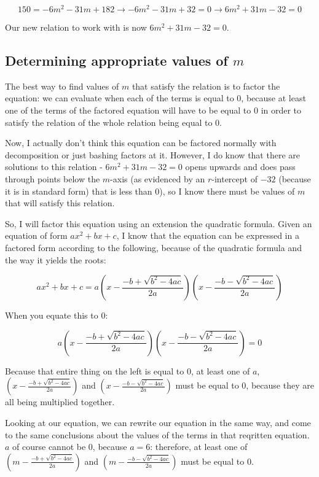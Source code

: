 \documentclass[12pt]{article}
\begin{document}
\[
150 = -6m^2 - 31m + 182 \longrightarrow -6m^2 - 31m + 32 = 0 \longrightarrow \boxed{6m^2 + 31m - 32 = 0}
\]

Our new relation to work with is now $6m^2 + 31m - 32 = 0$.

\subsection{Determining appropriate values of $m$}

The best way to find values of $m$ that satisfy the relation is to factor the equation: we can evaluate when each of the terms is equal to $0$, because at least one of the terms of the factored equation will have to be equal to $0$ in order to satisfy the relation of the whole relation being equal to $0$.

Now, I actually don't think this equation can be factored normally with decomposition or just bashing factors at it.
However, I do know that there are solutions to this relation - $6m^2 + 31m - 32 = 0$ opens upwards and does pass through points below the $m$-axis (as evidenced by an $r$-intercept of $-32$ (because it is in standard form) that is less than $0$), so I know there must be values of $m$ that will satisfy this relation.

So, I will factor this equation using an extension the quadratic formula.
Given an equation of form $ax^2 + bx + c$, I know that the equation can be expressed in a factored form according to the following, because of the quadratic formula and the way it yields the roots:

\[
ax^2 + bx + c = a \left( x - \frac{-b + \sqrt{b^2 - 4ac}}{2a} \right) \left( x - \frac{-b - \sqrt{b^2 - 4ac}}{2a} \right)
\]

When you equate this to $0$:

\[
a \left( x - \frac{-b + \sqrt{b^2 - 4ac}}{2a} \right) \left( x - \frac{-b - \sqrt{b^2 - 4ac}}{2a} \right) = 0
\]

Because that entire thing on the left is equal to $0$, at least one of $a$, $\left( x - \frac{-b + \sqrt{b^2 - 4ac}}{2a} \right)$ and $\left( x - \frac{-b - \sqrt{b^2 - 4ac}}{2a} \right)$ must be equal to $0$, because they are all being multiplied together.

Looking at our equation, we can rewrite our equation in the same way, and come to the same conclusions about the values of the terms in that reqritten equation. $a$ of course cannot be $0$, because $a = 6$: therefore, at least one of $\left( m - \frac{-b + \sqrt{b^2 - 4ac}}{2a} \right)$ and $\left( m - \frac{-b - \sqrt{b^2 - 4ac}}{2a} \right)$ must be equal to $0$.
\end{document}
